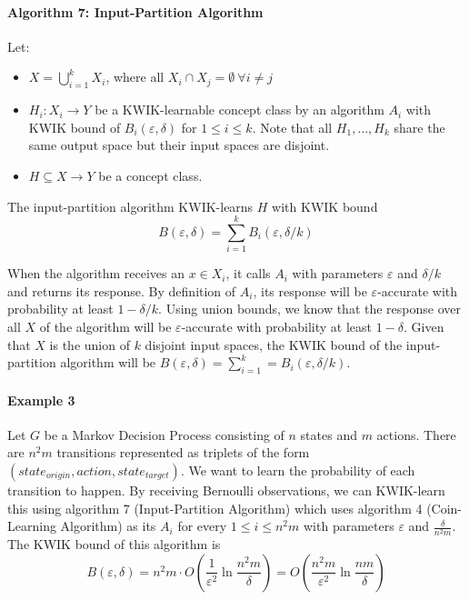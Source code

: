 \paragraph{Algorithm 7: Input-Partition Algorithm}
Let:
\begin{itemize}
  \item $X = \bigcup_{i=1}^k X_i$, where all $X_i \cap X_j = \emptyset \ \forall i \neq j$
  \item $H_i: X_i \to Y$ be a KWIK-learnable concept class by an algorithm $A_i$
  with KWIK bound of $B_i(\varepsilon, \delta)$ for $1 \leq i \leq k$. Note
  that all $H_1, \ldots, H_k$ share the same output space but their input spaces
  are disjoint.
  \item $H \subseteq X \to Y$ be a concept class.
\end{itemize}

The input-partition algorithm KWIK-learns $H$ with KWIK bound $$B(\varepsilon,
\delta) = \sum_{i=1}^k B_i(\varepsilon, \delta/k)$$

When the algorithm receives an $x \in X_i$, it calls $A_i$ with parameters
$\varepsilon$ and $\delta/k$ and returns its response. By definition of $A_i$,
its response will be $\varepsilon$-accurate with probability at least $1 -
\delta/k$. Using union bounds, we know that the response over all $X$ of the
algorithm will be $\varepsilon$-accurate with probability at least $1 - \delta$.
Given that $X$ is the union of $k$ disjoint input spaces, the KWIK bound
of the input-partition algorithm will be $B(\varepsilon, \delta) = \sum_{i=1}^k
= B_i(\varepsilon, \delta/k)$.

\paragraph{Example 3} Let $G$ be a Markov Decision Process consisting of $n$
states and $m$ actions. There are $n^2m$ transitions represented as triplets of
the form $(state_{origin}, action, state_{target})$. We want to learn the
probability of each transition to happen. By receiving Bernoulli observations,
we can KWIK-learn this using algorithm 7 (Input-Partition Algorithm) which
uses algorithm 4 (Coin-Learning Algorithm) as its $A_i$ for every $1 \leq i \leq
n^2m$ with parameters $\varepsilon$ and $\frac{\delta}{n^2m}$. The KWIK bound of
this algorithm is $$B(\varepsilon, \delta) = n^2m \cdot O\left(\frac{1}{\varepsilon^2}
\ln \frac{n^2m}{\delta}\right) = O\left(\frac{n^2m}{\varepsilon^2} \ln \frac{nm}{\delta}\right)$$

